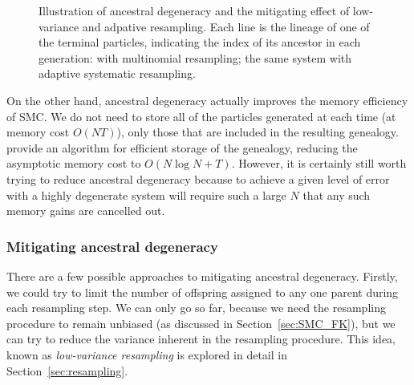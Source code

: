 \begin{figure}[ht]
\centering
{}
\caption[Ancestral degeneracy]{Illustration of ancestral degeneracy and the mitigating effect of low-variance and adpative resampling.
Each line is the lineage of one of the terminal particles, indicating the index of its ancestor in each generation:
 with multinomial resampling;
 the same system with adaptive systematic resampling.}
\label{fig:ancestral_degeneracy}
\end{figure}
On the other hand, ancestral degeneracy actually improves the memory efficiency of SMC. We do not need to store all of the particles generated at each time (at memory cost $O(NT)$), only those that are included in the resulting genealogy. \textcite{jacob2015} provide an algorithm for efficient storage of the genealogy, reducing the asymptotic memory cost to $O(N\log N+T)$.
However, it is certainly still worth trying to reduce ancestral degeneracy because to achieve a given level of error with a highly degenerate system will require such a large $N$ that any such memory gains are cancelled out.


\subsubsection{Mitigating ancestral degeneracy}
There are a few possible approaches to mitigating ancestral degeneracy.
Firstly, we could try to limit the number of offspring assigned to any one parent during each resampling step. We can only go so far, because we need the resampling procedure to remain unbiased (as discussed in Section~\ref{sec:SMC_FK}), but we can try to reduce the variance inherent in the resampling procedure. This idea, known as \emph{low-variance resampling} is explored in detail in Section~\ref{sec:resampling}.

